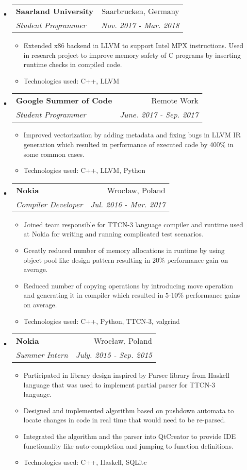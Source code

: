 \documentclass[letterpaper,11pt]{article}
\makeatletter
\newcommand{\resitem}[1]{\item #1 \vspace{-2pt}}
\newcommand{\ressubheading}[4]{
\begin{tabular*}{6.5in}{l@{\extracolsep{\fill}}r}
		\textbf{#1} & #2 \\
		\textit{#3} & \textit{#4} \\
\end{tabular*}\vspace{-6pt}}
\makeatother
\begin{document}
\begin{itemize}
\item
	\ressubheading{Saarland University}{Saarbrucken, Germany}{Student Programmer}{Nov. 2017 - Mar. 2018}
	\begin{itemize}
		\resitem{Extended x86 backend in LLVM to support Intel MPX instructions. Used in research project to improve memory safety of C programs by inserting runtime checks in compiled code. }
		\resitem{ Technologies used: C++, LLVM}
	\end{itemize}
\item
	\ressubheading{Google Summer of Code}{Remote Work}{Student Programmer}{June. 2017 - Sep. 2017}
	\begin{itemize}
		\resitem{ Improved vectorization by adding metadata and fixing bugs in LLVM IR generation which resulted in performance of executed code by 400\% in some common cases. }
		\resitem{ Technologies used: C++, LLVM, Python}
	\end{itemize}
\item
	\ressubheading{Nokia}{Wrocław, Poland}{Compiler Developer}{Jul. 2016 - Mar. 2017}
	\begin{itemize}
		\resitem{ Joined team responsible for TTCN-3 language compiler and runtime used at Nokia for writing and running complicated test scenarios.}
		\resitem{ Greatly reduced number of memory allocations in runtime by using object-pool like design pattern resulting in 20\% performance gain on average.}
		\resitem{ Reduced number of copying operations by introducing move operation and generating it in compiler which resulted in 5-10\% performance gains on average.}
		\resitem{ Technologies used: C++, Python, TTCN-3, valgrind }
	\end{itemize}
\item
	\ressubheading{Nokia}{Wrocław, Poland}{Summer Intern}{ July. 2015 - Sep. 2015}
	\begin{itemize}
		\resitem{Participated in library design inspired by Parsec library from Haskell language that was used to implement partial parser for TTCN-3 language.}
    	\resitem{Designed and implemented algorithm based on pushdown automata to locate changes in code in real time that would need to be re-parsed.}
    	\resitem{Integrated the algorithm and the parser into QtCreator to provide IDE functionality like auto-completion and jumping to function definitions.}
    	\resitem{Technologies used: C++, Haskell, SQLite}
	\end{itemize}
\end{itemize}
\end{document}
